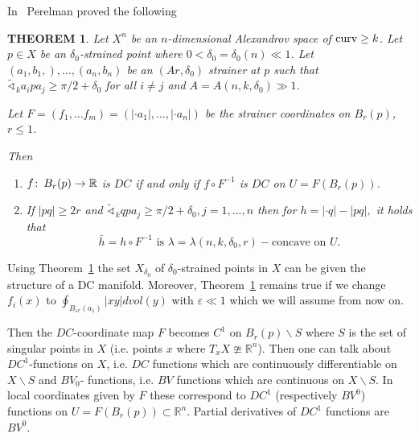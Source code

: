 \documentclass[12pt,leqno]{amsart}
\numberwithin{equation}{section}
\newtheorem{thm}{THEOREM}[section]
\theoremstyle{definition}
\theoremstyle{remark}
\newcommand{\R}{\mathbb{R}}
\def\co{\colon\thinspace}
\def\eps{\varepsilon}
\newcommand{\curv}{\mathop{\rm curv}}
\begin{document}
In~\cite{Per-DC} Perelman proved the following

\begin{thm}\label{thm-DC-Per}
Let $X^n$ be an $n$-dimensional Alexandrov space of $\curv\ge k$. Let $p\in X$ be an $\delta_0$-strained point where $0<\delta_0=\delta_0(n)\ll 1$. Let $ (a_1,b_1,),\ldots, (a_n,b_n)$ be an $(Ar,\delta_0)$ strainer at $p$ such that $\tilde\sphericalangle_ka_ipa_j\ge \pi/2+\delta_0$ for all $i\ne j$ and $A=A(n,k,\delta_0)\gg 1$.

Let  $F=(f_1,\ldots f_m)=(|\cdot a_1|,\ldots, |\cdot a_n|)$ be the strainer coordinates on $B_r(p)$, $r\le 1$.

Then

\begin{enumerate}
\item $f\co B_r(p)\to \R$ is $DC$ if and only if $f\circ F^{-1}$ is $DC$ on $U=F(B_r(p))$.
\item\label{semiconcave} If  $ |pq|\ge 2r$ and  $\tilde\sphericalangle_k qpa_j\ge \pi/2+\delta_0,  j=1,\ldots, n$ then for  $h=|\cdot q|-|pq|,$   it holds that
\[
\bar h=h\circ F^{-1} \text{ is } \lambda=\lambda(n, k,\delta_0,r)-\text{concave on } U.
\]
 \end{enumerate}
\end{thm}

Using Theorem~\ref{thm-DC-Per} the set $X_{\delta_0}$ of $\delta_0$-strained points in $X$ can be given the structure of a DC manifold. Moreover, Theorem~\ref{thm-DC-Per} remains true if we change  $f_i(x)$ to $\oint_{B_{\eps r}(a_1)}|xy|dvol(y)$ with $\eps\ll 1$ which we will assume from now on.

Then the $DC$-coordinate map $F$ becomes $C^1$ on $B_r(p)\backslash S$ where $S$ is the set of singular points in $X$ (i.e. points $x$ where $T_xX\ncong \R^n$).
Then one can talk about $DC^1$-functions on $X$, i.e. $DC$ functions which are continuously differentiable on $X\backslash S$ and $BV_0$- functions, i.e. $BV$ functions which are continuous on $X\backslash S$.
In local coordinates given by $F$ these correspond to $DC^1$ (respectively $BV^0$) functions on $U=F(B_r(p))\subset \R^n$.
Partial derivatives of $DC^1$ functions are $BV^0$.
\end{document}
